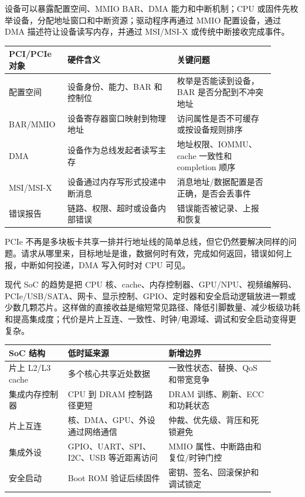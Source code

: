 设备可以暴露配置空间、MMIO BAR、DMA 能力和中断机制；CPU 或固件先枚举设备，分配地址窗口和中断资源；驱动程序再通过 MMIO 配置设备，通过 DMA 描述符让设备读写内存，并通过 MSI/MSI-X 或传统中断接收完成事件。

\begin{longtable}{L{0.18\linewidth}L{0.38\linewidth}L{0.34\linewidth}}
\toprule
PCI/PCIe 对象 & 硬件含义 & 关键问题 \\
\midrule
配置空间 & 设备身份、能力、BAR 和控制位 & 枚举是否能读到设备，BAR 是否分配到不冲突地址 \\\tablerowrule
BAR/MMIO & 设备寄存器窗口映射到物理地址 & 访问属性是否不可缓存或按设备规则排序 \\\tablerowrule
DMA & 设备作为总线发起者读写主存 & 地址权限、IOMMU、cache 一致性和 completion 顺序 \\\tablerowrule
MSI/MSI-X & 设备通过内存写形式投递中断消息 & 消息地址/数据配置是否正确，是否会丢事件 \\\tablerowrule
错误报告 & 链路、权限、超时或设备内部错误 & 错误能否被记录、上报和恢复 \\
\bottomrule
\end{longtable}

PCIe 不再是多块板卡共享一排并行地址线的简单总线，但它仍然要解决同样的问题。请求从哪里来，目标地址是谁，数据何时有效，完成如何返回，错误如何上报，中断如何投递，DMA 写入何时对 CPU 可见。

现代 SoC 的趋势是把 CPU 核、cache、内存控制器、GPU/NPU、视频编解码、PCIe/USB/SATA、网卡、显示控制、GPIO、定时器和安全启动逻辑放进一颗或少数几颗芯片。这样做的直接收益是缩短常见路径、降低引脚数量、减少板级功耗和提高集成度；代价是片上互连、一致性、时钟/电源域、调试和安全启动变得更复杂。

\begin{longtable}{L{0.2\linewidth}L{0.34\linewidth}L{0.36\linewidth}}
\toprule
SoC 结构 & 低时延来源 & 新增边界 \\
\midrule
片上 L2/L3 cache & 多个核心共享近处数据 & 一致性状态、替换、QoS 和带宽竞争 \\\tablerowrule
集成内存控制器 & CPU 到 DRAM 控制路径更短 & DRAM 训练、刷新、ECC 和功耗状态 \\\tablerowrule
片上互连 & 核、DMA、GPU、外设通过网络通信 & 仲裁、优先级、背压和死锁避免 \\\tablerowrule
集成外设 & GPIO、UART、SPI、I2C、USB 等近距离访问 & MMIO 属性、中断路由和复位/时钟门控 \\\tablerowrule
安全启动 & Boot ROM 验证后续固件 & 密钥、签名、回滚保护和调试锁定 \\
\bottomrule
\end{longtable}

